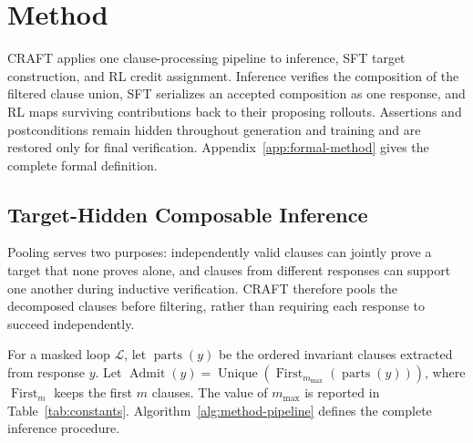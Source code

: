 \section{Method}\label{sec:method}

CRAFT applies one clause-processing pipeline to inference, SFT target
construction, and RL credit assignment.  Inference verifies the composition
of the filtered clause union, SFT serializes an accepted composition as one
response, and RL maps surviving contributions back to their proposing
rollouts.  Assertions and postconditions remain hidden throughout generation
and training and are restored only for final verification.
Appendix~\ref{app:formal-method} gives the complete formal definition.

\subsection{Target-Hidden Composable Inference}
\label{sec:method:core}
\label{sec:method:inference}

Pooling serves two purposes: independently valid clauses can jointly prove a
target that none proves alone, and clauses from different responses can
support one another during inductive verification.  CRAFT therefore pools
the decomposed clauses before filtering, rather than requiring each response
to succeed independently.

For a masked loop \(\mathcal L\), let \(\operatorname{parts}(y)\) be the
ordered invariant clauses extracted from response \(y\).  Let
\(\operatorname{Admit}(y)=\operatorname{Unique}(
\operatorname{First}_{m_{\max}}(\operatorname{parts}(y)))\), where
\(\operatorname{First}_{m}\) keeps the first \(m\) clauses.  The value of
\(m_{\max}\) is reported in Table~\ref{tab:constants}.
Algorithm~\ref{alg:method-pipeline} defines the complete inference procedure.

